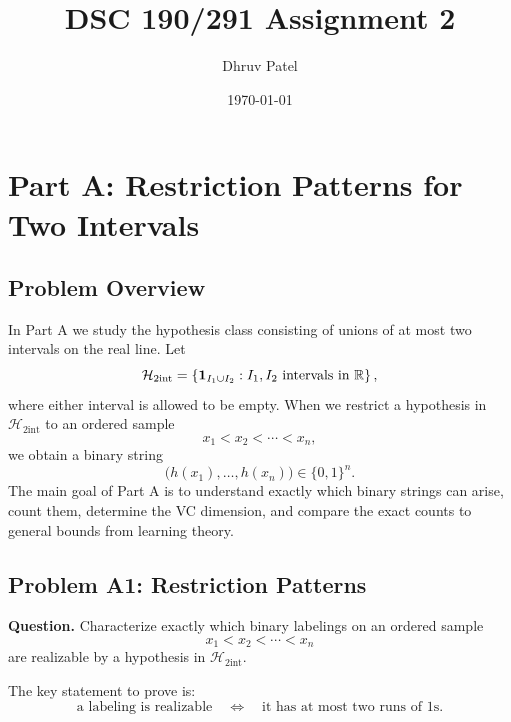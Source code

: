 \documentclass{article}
\title{\textbf{DSC 190/291 Assignment 2}}
\author{Dhruv Patel}
\date{\today}
\newcommand{\classA}{\mathcal{H}_{2\mathrm{int}}}
\newcommand{\zeroone}{\{0,1\}}
\begin{document}
\maketitle
\tableofcontents
\newpage

\section{Part A: Restriction Patterns for Two Intervals}

\subsection{Problem Overview}

In Part A we study the hypothesis class consisting of unions of at most two
intervals on the real line. Let
\[
\classA
=
\left\{
\mathbf{1}_{I_1 \cup I_2}
:
I_1,I_2 \text{ intervals in } \R
\right\},
\]
where either interval is allowed to be empty. When we restrict a hypothesis in
\(\classA\) to an ordered sample
\[
x_1 < x_2 < \cdots < x_n,
\]
we obtain a binary string
\[
\bigl(h(x_1),\dots,h(x_n)\bigr)\in \zeroone^n.
\]
The main goal of Part A is to understand exactly which binary strings can arise,
count them, determine the VC dimension, and compare the exact counts to general
bounds from learning theory.

\subsection{Problem A1: Restriction Patterns}

\textbf{Question.}
\newline
Characterize exactly which binary labelings on an ordered sample
\[
x_1 < x_2 < \cdots < x_n
\]
are realizable by a hypothesis in \(\classA\).

The key statement to prove is:
\[
\text{a labeling is realizable}
\quad\Longleftrightarrow\quad
\text{it has at most two runs of }1\text{s}.
\]
\end{document}
